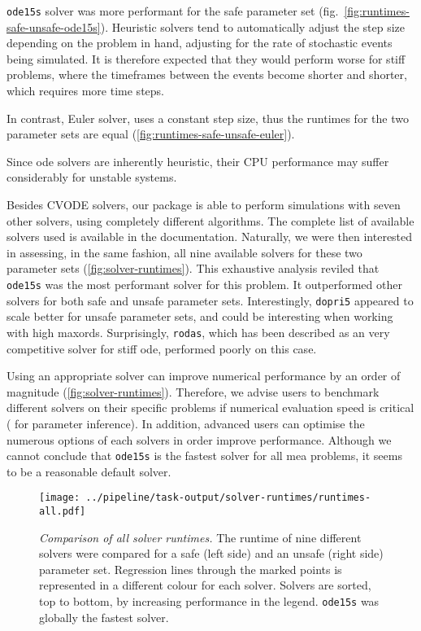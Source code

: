 \texttt{ode15s} solver was more performant for the safe parameter set (fig.~\ref{fig:runtimes-safe-unsafe-ode15s}).
Heuristic solvers tend to automatically adjust the step size depending on the problem in hand, adjusting for the rate of stochastic events being simulated.
It is therefore expected that they would perform worse for stiff problems, where the timeframes between the events become shorter and shorter, which requires more time steps.

In contrast, Euler solver, uses a constant step size, thus the runtimes for the two parameter sets are equal (\autoref{fig:runtimes-safe-unsafe-euler}).

Since \gls{ode} solvers are inherently heuristic, their CPU performance may suffer considerably for unstable systems.

Besides CVODE solvers, our package is able to perform simulations with seven other solvers, using completely different algorithms.
The complete list of available solvers used is available in the documentation.
Naturally, we were then interested in assessing, in the same fashion, all nine available solvers for these two parameter sets (\autoref{fig:solver-runtimes}).
This exhaustive analysis reviled that \texttt{ode15s} was the most performant solver for this problem.
It outperformed other solvers for both safe and unsafe parameter sets.
Interestingly, \texttt{dopri5} appeared to scale better for unsafe parameter sets, and could be interesting when working with high \gls{maxord}s.
Surprisingly, \texttt{rodas}, which has been described as an very competitive solver for stiff \gls{ode}\cite{sandu_benchmarking_1997},
performed poorly on this case.

Using an appropriate solver can improve numerical performance by an order of magnitude (\autoref{fig:solver-runtimes}).
Therefore, we advise users to benchmark different solvers on their specific problems if numerical evaluation speed is critical (\ie{} for parameter inference).
In addition, advanced users can optimise the numerous options of each solvers in order improve performance.
Although we cannot conclude that \texttt{ode15s} is the fastest solver for all \gls{mea} problems,
it seems to be a reasonable default solver.

\begin{figure}[bt]
    \centering
    \texttt{[image: ../pipeline/task-output/solver-runtimes/runtimes-all.pdf]}
    \caption{\emph{Comparison of all solver runtimes.}
    The runtime of nine different solvers were compared for a safe (left side) and an unsafe (right side) parameter set.
    Regression lines through the marked points is represented in a different colour for each solver.
    Solvers are sorted, top to bottom, by increasing performance in the legend.
    \texttt{ode15s} was globally the fastest solver.
    }
    \label{fig:solver-runtimes}
\end{figure}


